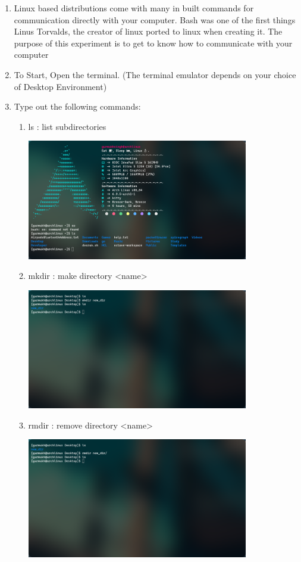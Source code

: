 \documentclass[12pt,letterpaper]{article}
\begin{document}
\begin{enumerate}
  \item Linux based distributions come with many in built commands for communication directly with your computer. Bash was one of the first things Linus Torvalds, the creator
    of linux ported to linux when creating it. The purpose of this experiment is to get to know how to communicate with your computer
  \item To Start, Open the terminal. (The terminal emulator depends on your choice of Desktop Environment)
  \item Type out the following commands:
    \begin{enumerate}
      \item ls : list subdirectories
        \begin{center}
          \includegraphics[width=0.8\textwidth]{screens/Pasted image (8).png}
        \end{center}
      \item mkdir : make directory <name>
        \begin{center}
          \includegraphics[width=0.8\textwidth]{screens/Pasted image (9).png}
        \end{center}
      \item rmdir : remove directory <name>
        \begin{center}
          \includegraphics[width=0.8\textwidth]{screens/Pasted image (10).png}

\end{center}
\end{enumerate}
\end{enumerate}
\end{document}
